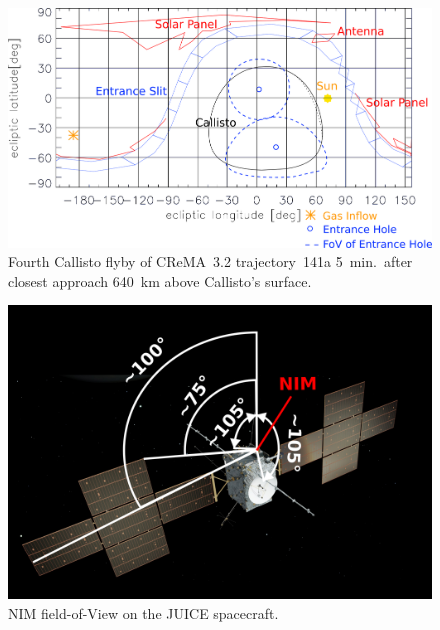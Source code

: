 	\begin{figure}[h!]
		\centering
		\includegraphics[width = .7\textwidth]{Bilder/NIM_pointing_2031JAN15195700.png}
		\caption{Fourth Callisto flyby of CReMA~3.2 trajectory~141a \cite{SOC_Crema3p2} 5~min.\ after closest approach 640~km above Callisto's surface.}
		\label{fig:FlybyCal1957}
	\end{figure}
	\begin{figure}[h!]
		\centering
		\includegraphics[width=.6\textwidth]{Bilder/SC_Angle.png}
		\caption{NIM field-of-View on the JUICE spacecraft.}
		\label{fig:SCFoV}
	\end{figure}

